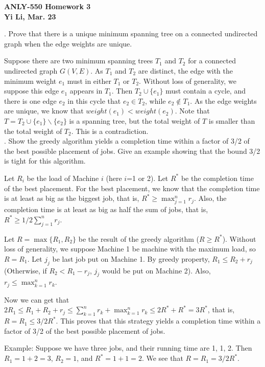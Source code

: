 \documentclass[11pt]{article} %
\begin{document}
\begin{center}
\large
\bf
ANLY-550 Homework 3 \\[1pc]
\rm
\normalsize
Yi Li, Mar. 23 \\[1.5pc]  
\end{center}


\normalsize
{}. Prove that there is a unique minimum spanning tree on a connected undirected graph when the edge weights are unique.

Suppose there are two minimum spanning trees $T_1$ and $T_2$ for a connected undirected graph $G(V, E)$. As $T_1$ and $T_2$ are distinct, the edge with the minimum weight $e_1$ must in either $T_1$ or $T_2$. Without loss of generality, we suppose this edge $e_1$ appears in $T_1$. Then $T_2 \cup \{e_1\}$ must contain a cycle, and there is one edge $e_2$ in this cycle that $e_2 \in T_2$, while $e_2 \notin T_1$. As the edge weights are unique, we know that $weight(e_1) < weight(e_2)$. Note that $T=T_2 \cup \{e_1\} \backslash \{e_2\}$ is a spanning tree, but the total weight of $T$ is smaller than the total weight of $T_2$. This is a contradiction.\\

. Show the greedy algorithm yields a completion time within a factor of 3/2 of the best possible placement of jobs. Give an example showing that the bound 3/2 is tight for this algorithm.

Let $ R_i$ be the load of Machine $i$ (here $i$=1 or 2). Let $R^*$ be the completion time of the best placement. For the best placement, we know that
the completion time is at least as big as the biggest job, that is, $R^* \geq \max_{j=1}^n r_j$. Also, the completion time is at least as big as half the sum of jobs, that is, $R^* \geq 1/2 \sum_{j=1}^n r_j$.

Let $R=\max\{ R_1, R_2 \}$ be the result of the greedy algorithm ($R \geq R^*$). 
Without loss of generality, we suppose Machine 1 be machine with the maximum load, so $R = R_1$.    
Let $j_j$ be last job put on Machine 1. By greedy property, $R_1 \leq R_2 + r_j$ (Otherwise, if $R_2<R_1-r_j$, $j_j$ would be put on Machine 2). Also, $r_j \leq \max_{k=1}^n r_k$.
    
Now we can get that
$2R_1 \leq R_1 + R_2 + r_j \leq \sum_{k=1}^n r_k + \max_{k=1}^n r_k \leq 2R^* + R^* = 3 R^*$,
that is, $R = R_1 \leq  3/2 R^*$. This proves that this strategy yields a completion time within a factor of 3/2 of the best possible placement of jobs.

Example: Suppose we have three jobs, and their running time are 1, 1, 2. Then $R_1=1+2=3$, $R_2=1$, and $R^*=1+1=2$. We see that $R=R_1=3/2R^*$.\\
\end{document}
